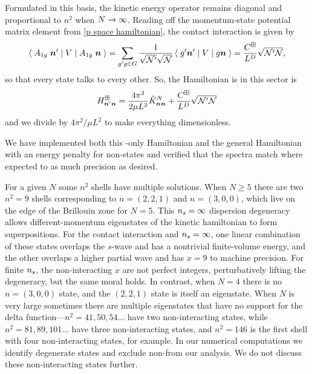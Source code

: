 Formulated in this basis, the kinetic energy operator remains diagonal and proportional to $n^2$ when $N\rightarrow\infty$.
Reading off the momentum-state potential matrix element from \eqref{p space hamiltonian}, the contact interaction is given by
\begin{equation}
    \left\langle\;A_{1g}\; \boldsymbol{n}'\;\middle|\;V\;\middle|\;A_{1g}\; \boldsymbol{n}\;\right\rangle
    =
    \sum_{g'g \in G}
        \frac{1}{\sqrt{\mathcal{N}'}\sqrt{\mathcal{N}}} \left\langle\;g'\boldsymbol{n}'\;\middle|\;V\;\middle|\;g\boldsymbol{n}\;\right\rangle
    =
    \frac{C^\boxplus}{L^D} \sqrt{\mathcal{N}'\mathcal{N}},
\end{equation}
so that every \Aoneg state talks to every other.
So, the Hamiltonian is in this sector is
\begin{equation}
    H_{\boldsymbol{n}'\boldsymbol{n}}^\boxplus = \frac{4 \pi^2}{2\mu L^2} \tilde K_{\boldsymbol{n} \boldsymbol{n}}^{N} + \frac{C^\boxplus}{L^D} \sqrt{\mathcal{N}'\mathcal{N}}
\end{equation}
and we divide by $4\pi^2/\mu L^2$ to make everything dimensionless.

We have implemented both this \Aoneg-only Hamiltonian and the general Hamiltonian with an energy penalty for non-\Aoneg states and verified that the spectra match where expected to as much precision as desired.

For a given $N$ some $n^2$ shells have multiple solutions.
When $N\geq5$ there are two $n^2=9$ shells corresponding to $n=(2,2,1)$ and $n=(3,0,0)$, which live on the edge of the Brillouin zone for $N=5$.
This ${n_s}=\infty$ dispersion degeneracy allows different-momentum eigenstates of the kinetic hamiltonian to form superpositions.
For the contact interaction and ${n_s}=\infty$, one linear combination of these \Aoneg states overlaps the $s$-wave and has a nontrivial finite-volume energy, and the other overlaps a higher partial wave and has $x=9$ to machine precision.
For finite ${n_s}$, the non-interacting $x$ are not perfect integers, perturbatively lifting the degeneracy, but the same moral holds.
In contrast, when $N=4$ there is no $n=(3,0,0)$ state, and the $(2,2,1)$ state is itself an eigenstate.
When $N$ is very large sometimes there are multiple eigenstates that have no support for the delta function---$n^2=41, 50, 54\ldots$ have two non-interacting states, while $n^2=81, 89, 101\ldots$ have three non-interacting states, and $n^2=146$ is the first shell with four non-interacting states, for example.
In our numerical computations we identify degenerate states and exclude non-\Aoneg from our analysis.
We do not discuss these non-interacting states further.
